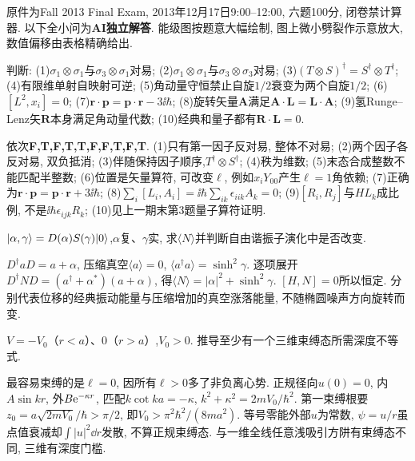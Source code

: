 原件为Fall 2013 Final Exam, 2013年12月17日9:00--12:00, 六题100分, 闭卷禁计算器. 以下全小问为\textbf{AI独立解答}. 能级图按题意大幅绘制, 图上微小劈裂作示意放大, 数值偏移由表格精确给出.
\begin{exercise}
判断: (1)$\sigma_1\otimes\sigma_1$与$\sigma_3\otimes\sigma_1$对易; (2)$\sigma_1\otimes\sigma_1$与$\sigma_3\otimes\sigma_3$对易; (3)$(T\otimes S)^\dagger=S^\dagger\otimes T^\dagger$; (4)有限维单射自映射可逆; (5)角动量守恒禁止自旋$1/2$衰变为两个自旋$1/2$; (6)$[L^2,x_i]=0$; (7)$\boldsymbol r\cdot\boldsymbol p=\boldsymbol p\cdot\boldsymbol r-3\ii\hbar$; (8)旋转矢量$\boldsymbol A$满足$\boldsymbol A\cdot\boldsymbol L=\boldsymbol L\cdot\boldsymbol A$; (9)氢Runge--Lenz矢$\boldsymbol R$本身满足角动量代数; (10)经典和量子都有$\boldsymbol R\cdot\boldsymbol L=0$.
\end{exercise}
\begin{solution}
依次\textbf{F,T,F,T,T,F,F,T,F,T}. (1)只有第一因子反对易, 整体不对易; (2)两个因子各反对易, 双负抵消; (3)伴随保持因子顺序,$T^\dagger\otimes S^\dagger$; (4)秩为维数; (5)末态合成整数不能匹配半整数; (6)位置是矢量算符, 可改变$\ell$, 例如$x_iY_{00}$产生$\ell=1$角依赖; (7)正确为$\boldsymbol r\cdot\boldsymbol p=\boldsymbol p\cdot\boldsymbol r+3\ii\hbar$; (8)$\sum_i[L_i,A_i]=\ii\hbar\sum_{ik}\epsilon_{iik}A_k=0$; (9)$[R_i,R_j]$与$HL_k$成比例, 不是$\ii\hbar\epsilon_{ijk}R_k$; (10)见上一期末第3题量子算符证明.
\end{solution}
\begin{exercise}
$\lvert \alpha,\gamma\rangle=D(\alpha)S(\gamma)\lvert 0\rangle$,$\alpha$复、$\gamma$实, 求$\langle N\rangle$并判断自由谐振子演化中是否改变.
\end{exercise}
\begin{solution}
$D^\dagger aD=a+\alpha$, 压缩真空$\langle a\rangle=0$, $\langle a^\dagger a\rangle=\sinh^2\gamma$. 逐项展开$D^\dagger ND=(a^\dagger+\alpha^*)(a+\alpha)$, 得$\langle N\rangle=|\alpha|^2+\sinh^2\gamma$. $[H,N]=0$所以恒定. 分别代表位移的经典振动能量与压缩增加的真空涨落能量, 不随椭圆噪声方向旋转而变.
\end{solution}
\begin{exercise}
$V=-V_0$（$r<a$）、0（$r>a$）,$V_0>0$. 推导至少有一个三维束缚态所需深度不等式.
\end{exercise}
\begin{solution}
最容易束缚的是$\ell=0$, 因所有$\ell>0$多了非负离心势. 正规径向$u(0)=0$, 内$A\sin kr$, 外$B\mathrm e^{-\kappa r}$, 匹配$k\cot ka=-\kappa$, $k^2+\kappa^2=2mV_0/\hbar^2$. 第一束缚根要$z_0=a\sqrt{2mV_0}/\hbar>\pi/2$, 即$V_0>\pi^2\hbar^2/(8ma^2)$. 等号零能外部$u$为常数, $\psi=u/r$虽点值衰减却$\int|u|^2\dd r$发散, 不算正规束缚态. 与一维全线任意浅吸引方阱有束缚态不同, 三维有深度门槛.
\end{solution}
